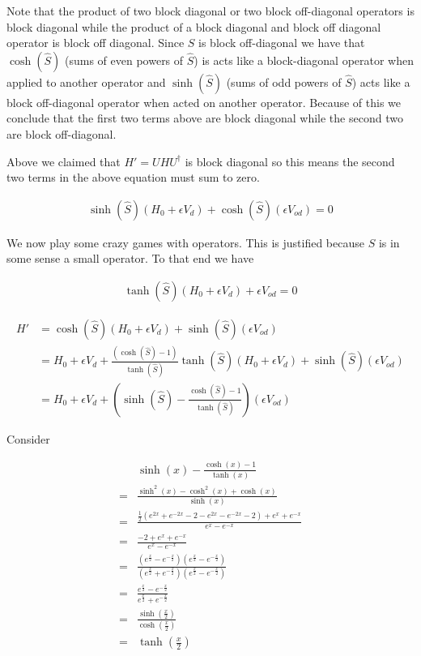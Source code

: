 \documentclass[12pt]{article}
\begin{document}
Note that the product of two block diagonal or two block off-diagonal operators is block diagonal while the product of a block diagonal and block off diagonal operator is block off diagonal. Since $S$ is block off-diagonal we have that $\cosh(\hat{S})$ (sums of even powers of $\hat{S}$) is acts like a block-diagonal operator when applied to another operator and $\sinh(\hat{S})$ (sums of odd powers of $\hat{S}$) acts like a block off-diagonal operator when acted on another operator. Because of this we conclude that the first two terms above are block diagonal while the second two are block off-diagonal.

Above we claimed that $H'=UHU^{\dag}$ is block diagonal so this means the second two terms in the above equation must sum to zero.

\begin{align}
\sinh(\hat{S})(H_0+\epsilon V_d) + \cosh(\hat{S})(\epsilon V_{od}) = 0
\end{align}

We now play some crazy games with operators. This is justified because $S$ is in some sense a small operator. To that end we have

\begin{align}
\tanh(\hat{S})(H_0 + \epsilon V_d) + \epsilon V_{od} = 0
\end{align}

\begin{equation}
\begin{split}
H' &= \cosh(\hat{S})(H_0 + \epsilon V_d) + \sinh(\hat{S})(\epsilon V_{od})\\
&= H_0 + \epsilon V_d + \frac{(\cosh(\hat{S})-1)}{\tanh(\hat{S})} \tanh(\hat{S}) (H_0 + \epsilon V_d) + \sinh(\hat{S})(\epsilon V_{od})\\
&= H_0 + \epsilon V_d + \left(\sinh(\hat{S}) - \frac{\cosh(\hat{S})-1}{\tanh(\hat{S})} \right)(\epsilon V_{od})
\end{split}
\end{equation}

Consider

\begin{equation}
\begin{split}
&\sinh(x) - \frac{\cosh(x) - 1}{\tanh(x)}\\
=& \frac{\sinh^2(x) - \cosh^2(x) + \cosh(x)}{\sinh(x)}\\
=& \frac{\frac{1}{2}\left(e^{2x} + e^{-2x} - 2 - e^{2x} - e^{-2x} -2\right) + e^x + e^{-x}}{e^x-e^{-x}}\\
=& \frac{-2 + e^x + e^{-x}}{e^x -e^{-x}}\\
=& \frac{(e^{\frac{x}{2}} - e^{-\frac{x}{2}})(e^{\frac{x}{2}} - e^{-\frac{x}{2}})}{(e^{\frac{x}{2}} + e^{-\frac{x}{2}})(e^{\frac{x}{2}} - e^{-\frac{x}{2}})}\\
=& \frac{e^{\frac{x}{2}} - e^{-\frac{x}{2}}}{e^{\frac{x}{2}} + e^{-\frac{x}{2}}}\\
=& \frac{\sinh(\frac{x}{2})}{\cosh(\frac{x}{2})}\\
=& \tanh\left(\frac{x}{2}\right)
\end{split}
\end{equation}
\end{document}
